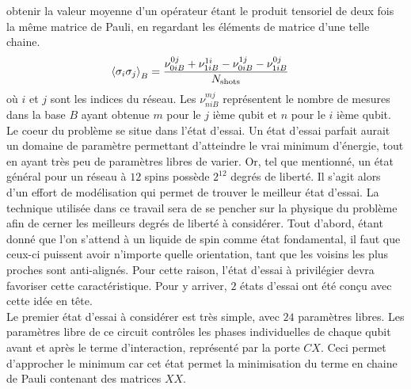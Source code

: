 \documentclass[../main.tex]{subfiles}
\begin{document}
        obtenir la valeur moyenne d'un opérateur étant le produit tensoriel de
        deux fois la même matrice de Pauli, en regardant les éléments de matrice
        d'une telle chaine.
        \begin{align}
            \expval{\sigma_i\sigma_j}_B&=\frac{\nu_{0iB}^{0j}+\nu_{1iB}^{1i}-\nu_{0iB}^{1j}-\nu_{1iB}^{0j}}{N_{\text{shots}}}
        \end{align}
        où $i$ et $j$ sont les indices du réseau. Les $\nu^{mj}_{niB}$ représentent le nombre
        de mesures dans la base $B$ ayant obtenue $m$ pour le $j$ ième qubit et $n$ pour le $i$ ième
        qubit.\\
        Le coeur du problème se situe dans l'état d'essai. Un état d'essai
        parfait aurait un domaine de paramètre permettant d'atteindre le vrai
        minimum d'énergie, tout en ayant très peu de paramètres libres de varier.
        Or, tel que mentionné, un état général pour un réseau à $12$ spins
        possède $2^{12}$ degrés de liberté. Il s'agit alors d'un effort de
        modélisation qui permet de trouver le meilleur état d'essai. La technique
        utilisée dans ce travail sera de se pencher sur la physique du problème
        afin de cerner les meilleurs degrés de liberté à considérer. Tout d'abord,
        étant donné que l'on s'attend à un liquide de spin comme état fondamental,
        il faut que ceux-ci puissent avoir n'importe quelle orientation, tant
        que les voisins les plus proches sont anti-alignés. Pour cette raison,
        l'état d'essai à privilégier devra favoriser cette caractéristique.
        Pour y arriver, $2$ états d'essai ont été conçu avec cette idée en tête.\\
        Le premier état d'essai à considérer est très simple, avec $24$ paramètres
        libres.
        Les paramètres libre de ce circuit contrôles les phases individuelles
        de chaque qubit avant et après le terme d'interaction, représenté par
        la porte $CX$. Ceci permet d'approcher le minimum car cet état permet
        la minimisation du terme en chaine de Pauli contenant des matrices $XX$.
\end{document}
